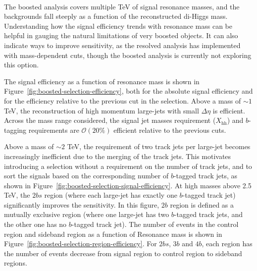 \paragraph{}
The boosted analysis covers multiple TeV of signal resonance masses, and the backgrounds fall steeply as a function of the reconstructed di-Higgs mass. Understanding how the signal efficiency trends with resonance mass can be helpful in gauging the natural limitations of very boosted objects. It can also indicate ways to improve sensitivity, as the resolved analysis has implemented with mass-dependent cuts, though the boosted analysis is currently not exploring this option.

The signal efficiency as a function of resonance mass is shown in Figure~\ref{fig:boosted-selection-efficiency}, both for the absolute signal efficiency and for the efficiency relative to the previous cut in the selection. Above a mass of $\sim\!1$ TeV, the reconstruction of high momentum large-\R jets with small $\Delta\eta$ is efficient. Across the mass range considered, the signal jet masses requirement ($X_\text{hh}$) and $b$-tagging requirements are $\mathcal{O}(20\%)$ efficient relative to the previous cuts. 

Above a mass of $\sim\!2$ TeV, the requirement of two track jets per large-\R jet becomes increasingly inefficient due to the merging of the track jets. This motivates introducing a selection without a requirement on the number of track jets, and to sort the signals based on the corresponding number of $b$-tagged track jets, as shown in Figure~\ref{fig:boosted-selection-signal-efficiency}. At high masses above 2.5 TeV, the $2bs$ region (where each large-\R jet has exactly one $b$-tagged track jet) significantly improves the sensitivity. In this figure, $2b$ region is defined as a mutually exclusive region (where one large-\R jet has two $b$-tagged track jets, and the other one has no $b$-tagged track jet). The number of events in the control region and sideband region as a function of Resonance mass is shown in Figure~\ref{fig:boosted-selection-region-efficiency}. For $2bs$, $3b$ and $4b$, each region has the number of events decrease from signal region to control region to sideband regions.

